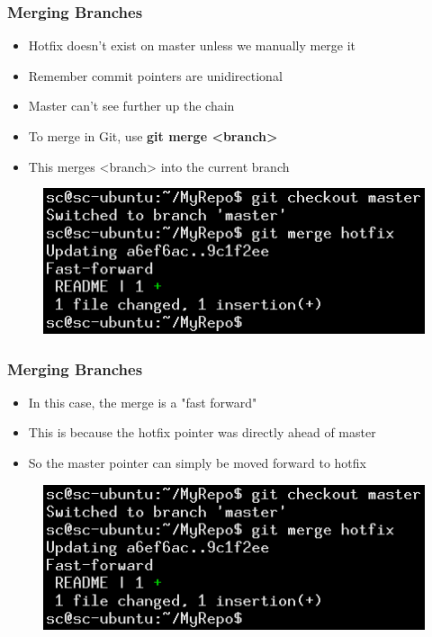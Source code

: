 \documentclass{beamer}
\begin{document}
\begin{frame}
	\frametitle{Merging Branches}
	\begin{itemize}
		\item{Hotfix doesn't exist on master unless we manually merge it}
		\item{Remember commit pointers are unidirectional}
		\item{Master can't see further up the chain}
		\item{To merge in Git, use \textbf{git merge \textless{}branch\textgreater{}}}
		\item{This merges \textless{}branch\textgreater{} into the current branch}
	\end{itemize}
	\begin{figure}
		\includegraphics[scale=0.5]{Merging_Branches-3.png}
	\end{figure}
\end{frame}

\begin{frame}
	\frametitle{Merging Branches}
	\begin{itemize}
		\item{In this case, the merge is a "fast forward"}
		\item{This is because the hotfix pointer was directly ahead of master}
		\item{So the master pointer can simply be moved forward to hotfix}
	\end{itemize}
	\begin{figure}
		\includegraphics[scale=0.5]{Merging_Branches-3.png}
	\end{figure}
\end{frame}
\end{document}
